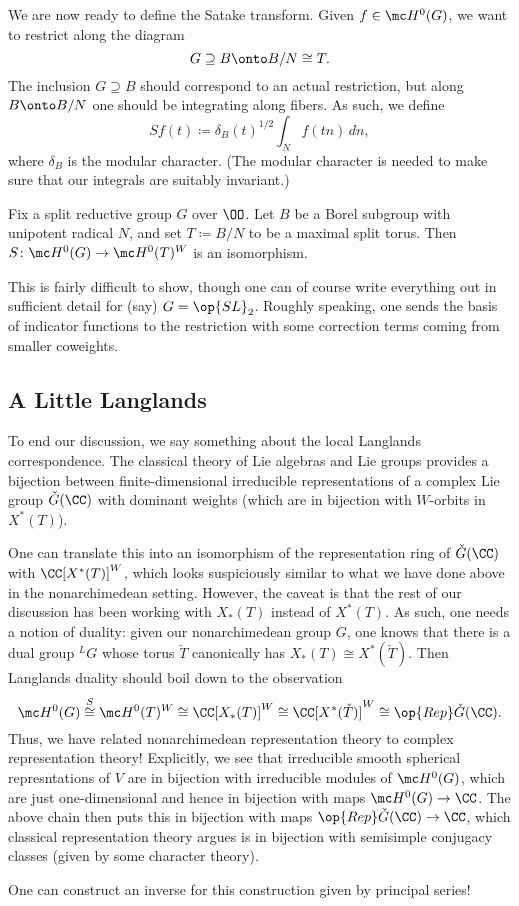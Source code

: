 \documentclass{article}
\begin{document}
We are now ready to define the Satake transform. Given $f\in\mc H^0(G)$, we want to restrict along the diagram
\[G\supseteq B\onto B/N\cong T.\]
The inclusion $G\supseteq B$ should correspond to an actual restriction, but along $B\onto B/N$ one should be integrating along fibers. As such, we define
\[Sf(t)\coloneqq\delta_B(t)^{1/2}\int_Nf(tn)\,dn,\]
where $\delta_B$ is the modular character. (The modular character is needed to make sure that our integrals are suitably invariant.)
\begin{theorem}[Satake]
	Fix a split reductive group $G$ over $\OO$. Let $B$ be a Borel subgroup with unipotent radical $N$, and set $T\coloneqq B/N$ to be a maximal split torus. Then $S\colon\mc H^0(G)\to\mc H^0(T)^W$ is an isomorphism.
\end{theorem}
This is fairly difficult to show, though one can of course write everything out in sufficient detail for (say) $G=\op{SL}_2$. Roughly speaking, one sends the basis of indicator functions to the restriction with some correction terms coming from smaller coweights.

\subsection{A Little Langlands}
To end our discussion, we say something about the local Langlands correspondence. The classical theory of Lie algebras and Lie groups provides a bijection between finite-dimensional irreducible representations of a complex Lie group $\check G(\CC)$ with dominant weights (which are in bijection with $W$-orbits in $X^*(T)$).

One can translate this into an isomorphism of the representation ring of $\check G(\CC)$ with $\CC[X^*(T)]^W$, which looks suspiciously similar to what we have done above in the nonarchimedean setting. However, the caveat is that the rest of our discussion has been working with $X_*(T)$ instead of $X^*(T)$. As such, one needs a notion of duality: given our nonarchimedean group $G$, one knows that there is a dual group $^LG$ whose torus $\check T$ canonically has $X_*(T)\cong X^*(\check T)$. Then Langlands duality should boil down to the observation
\[\mc H^0(G)\stackrel S\cong\mc H^0(T)^W\cong\CC[X_*(T)]^W\cong\CC[X^*(\check T)]^W\cong\op{Rep}\check G(\CC).\]
Thus, we have related nonarchimedean representation theory to complex representation theory! Explicitly, we see that irreducible smooth spherical represntations of $V$ are in bijection with irreducible modules of $\mc H^0(G)$, which are just one-dimensional and hence in bijection with maps $\mc H^0(G)\to\CC$. The above chain then puts this in bijection with maps $\op{Rep}\check G(\CC)\to\CC$, which classical representation theory argues is in bijection with semisimple conjugacy classes (given by some character theory).
\begin{remark}
	One can construct an inverse for this construction given by principal series!
\end{remark}
\end{document}
